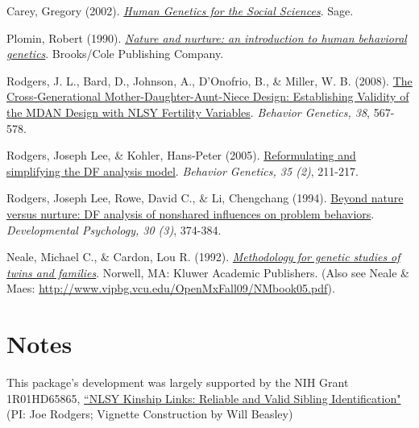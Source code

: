\documentclass{article}\usepackage[]{graphicx}\usepackage[]{color}
\begin{document}
Carey, Gregory (2002). \href{http://psych.colorado.edu/~carey/hgss/}{\emph{Human Genetics for the Social Sciences}}. Sage.

Plomin, Robert (1990). \href{http://books.google.com/books?id=r7AgAQAAIAAJ&source=gbs_navlinks_s}{\emph{Nature and nurture: an introduction to human behavioral genetics}}.  Brooks/Cole Publishing Company.

Rodgers, J. L., Bard, D., Johnson, A., D'Onofrio, B., \& Miller, W. B. (2008). \href{http://www.ncbi.nlm.nih.gov/pubmed/18825497}{The Cross-Generational Mother-Daughter-Aunt-Niece Design: Establishing Validity of the MDAN Design with NLSY Fertility Variables}. \emph{Behavior Genetics, 38}, 567-578.

Rodgers, Joseph Lee, \& Kohler, Hans-Peter (2005). \href{http://www.springerlink.com/content/n3x1v1q282583366}{Reformulating and simplifying the DF analysis model}. \emph{Behavior Genetics, 35 (2)}, 211-217.

Rodgers, Joseph Lee, Rowe, David C., \& Li, Chengchang (1994). \href{http://psycnet.apa.org/journals/dev/30/3/374/}{Beyond nature versus nurture: DF analysis of nonshared influences on problem behaviors}. \emph{Developmental Psychology, 30 (3)}, 374-384. 

Neale, Michael C., \& Cardon, Lou R. (1992). \href{http://books.google.com/books/about/Methodology_for_genetic_studies_of_twins.html?id=vVzDmDv6WDkC}{\emph{Methodology for genetic studies of twins and families}}. Norwell, MA: Kluwer Academic Publishers. (Also see Neale \& Maes: \url{http://www.vipbg.vcu.edu/OpenMxFall09/NMbook05.pdf}).
 
\section{Notes}
This package's development was largely supported by the NIH Grant 1R01HD65865, \href{http://taggs.hhs.gov/AwardDetail.cfm?s_Award_Num=R01HD065865&n_Prog_Office_Code=50}{``NLSY Kinship Links: Reliable and Valid Sibling Identification"} (PI: Joe Rodgers; Vignette Construction by Will Beasley)
\end{document}
